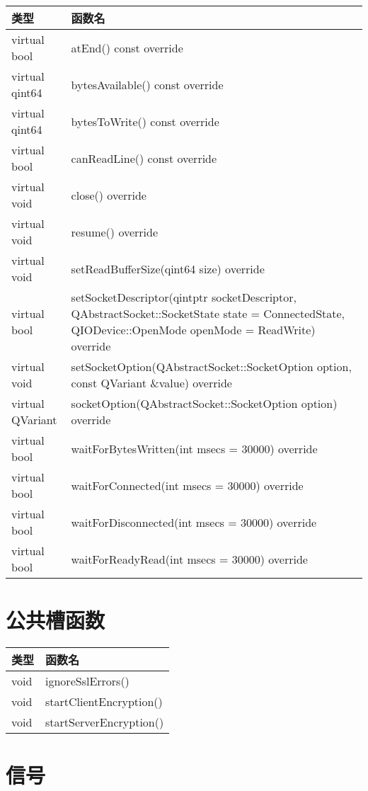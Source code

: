 \begin{longtable}[l]{|l|m{30em}|}
\hline 
类型 &	函数名\\ 
\hline 
virtual bool &	atEnd() const override \\ 
\hline
virtual qint64 	&bytesAvailable() const override \\ 
\hline
virtual qint64 &	bytesToWrite() const override \\ 
\hline
virtual bool &	canReadLine() const override \\ 
\hline
virtual void &	close() override \\
\hline
virtual void &	resume() override \\ 
\hline
virtual void &	setReadBufferSize(qint64 size) override \\ 
\hline
virtual bool &	setSocketDescriptor(qintptr socketDescriptor, QAbstractSocket::SocketState state = ConnectedState, QIODevice::OpenMode openMode = ReadWrite) override \\ 
\hline
virtual void &	setSocketOption(QAbstractSocket::SocketOption option, const QVariant \&value) override \\
\hline
virtual QVariant &	socketOption(QAbstractSocket::SocketOption option) override \\ 
\hline
virtual bool &	waitForBytesWritten(int msecs = 30000) override \\ 
\hline
virtual bool &	waitForConnected(int msecs = 30000) override \\ 
\hline
virtual bool &	waitForDisconnected(int msecs = 30000) override \\ 
\hline
virtual bool &	waitForReadyRead(int msecs = 30000) override \\ 
	\hline
\end{longtable}

\section{公共槽函数}

\begin{tabular}[l]{|l|m{30em}|}
	\hline 
	类型 &	函数名\\ 
	\hline 
	void &	ignoreSslErrors() \\ 
	\hline
	void &	startClientEncryption() \\ 
	\hline
	void &	startServerEncryption() \\ 
	\hline
\end{tabular}

\section{信号}

